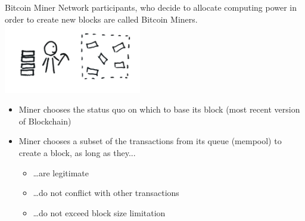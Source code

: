 \documentclass[]{beamer}
\begin{document}
\begin{frame}{Bitcoin Miner}
Network participants, who decide to allocate computing power in order to create new blocks are called Bitcoin Miners.
\center
\includegraphics[width=6cm]{../assets/images/miner.png}

\begin{itemize}
\item{Miner chooses the status quo on which to base its block (most recent version of Blockchain)}
\item{Miner chooses a subset of the transactions from its queue (mempool) to create a block, as long as they...}
	\begin{itemize}
	\item{\dots are legitimate}
	\item{\dots do not conflict with other transactions}
	\item{\dots do not exceed block size limitation}
	\end{itemize}
\end{itemize}
\end{frame}
\end{document}
